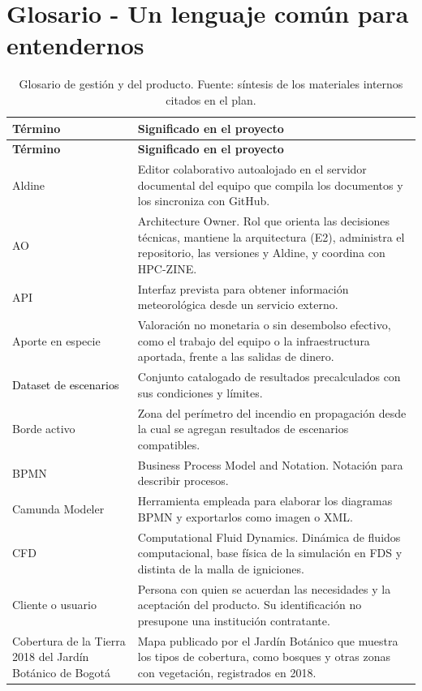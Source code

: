 \clearpage
\section{Glosario - Un lenguaje común para entendernos}\label{sec:spmp-7}
\begin{longtable}{|p{0.29\dimexpr\linewidth-23pt\relax}|p{0.71\dimexpr\linewidth-23pt\relax}|}
\caption{Glosario de gestión y del producto. Fuente: síntesis de los materiales internos citados en el plan.}\\
\hline
\textbf{Término} & \textbf{Significado en el proyecto}\\\hline
\endfirsthead
\hline
\textbf{Término} & \textbf{Significado en el proyecto}\\\hline
\endhead
Aldine & Editor colaborativo autoalojado en el servidor documental del equipo que compila los documentos y los sincroniza con GitHub.\\\hline
AO & Architecture Owner. Rol que orienta las decisiones técnicas, mantiene la arquitectura (E2), administra el repositorio, las versiones y Aldine, y coordina con HPC-ZINE.\\\hline
API & Interfaz prevista para obtener información meteorológica desde un servicio externo.\\\hline
Aporte en especie & Valoración no monetaria o sin desembolso efectivo, como el trabajo del equipo o la infraestructura aportada, frente a las salidas de dinero.\\\hline\textcolor{black}{Dataset de escenarios} & Conjunto catalogado de resultados precalculados con sus condiciones y límites.\\\hline
Borde activo & Zona del perímetro del incendio en propagación desde la cual se agregan resultados de escenarios compatibles.\\\hline
BPMN & Business Process Model and Notation. Notación para describir procesos.\\\hline
Camunda Modeler & Herramienta empleada para elaborar los diagramas BPMN y exportarlos como imagen o XML.\\\hline
CFD & Computational Fluid Dynamics. Dinámica de fluidos computacional, base física de la simulación en FDS y distinta de la malla de igniciones.\\\hline
Cliente o usuario & Persona con quien se acuerdan las necesidades y la aceptación del producto. Su identificación no presupone una institución contratante.\\\hline
Cobertura de la Tierra 2018 del Jardín Botánico de Bogotá & Mapa publicado por el Jardín Botánico que muestra los tipos de cobertura, como bosques y otras zonas con vegetación, registrados en 2018.\\\hline

\end{longtable}
